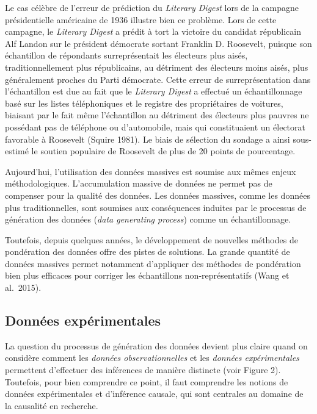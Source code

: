 \documentclass[
  letterpaper,
]{scrbook}
\begin{document}
Le cas célèbre de l'erreur de prédiction du \emph{Literary Digest} lors
de la campagne présidentielle américaine de 1936 illustre bien ce
problème. Lors de cette campagne, le \emph{Literary Digest} a prédit à
tort la victoire du candidat républicain Alf Landon sur le président
démocrate sortant Franklin D. Roosevelt, puisque son échantillon de
répondants surreprésentait les électeurs plus aisés, traditionnellement
plus républicains, au détriment des électeurs moins aisés, plus
généralement proches du Parti démocrate. Cette erreur de
surreprésentation dans l'échantillon est due au fait que le
\emph{Literary Digest} a effectué un échantillonnage basé sur les listes
téléphoniques et le registre des propriétaires de voitures, biaisant par
le fait même l'échantillon au détriment des électeurs plus pauvres ne
possédant pas de téléphone ou d'automobile, mais qui constituaient un
électorat favorable à Roosevelt (Squire 1981). Le biais de sélection du
sondage a ainsi sous-estimé le soutien populaire de Roosevelt de plus de
20 points de pourcentage.

Aujourd'hui, l'utilisation des données massives est soumise aux mêmes
enjeux méthodologiques. L'accumulation massive de données ne permet pas
de compenser pour la qualité des données. Les données massives, comme
les données plus traditionnelles, sont soumises aux conséquences
induites par le processus de génération des données (\emph{data
generating process}) comme un échantillonnage.

Toutefois, depuis quelques années, le développement de nouvelles
méthodes de pondération des données offre des pistes de solutions. La
grande quantité de données massives permet notamment d'appliquer des
méthodes de pondération bien plus efficaces pour corriger les
échantillons non-représentatifs (Wang et al.~2015).

\hypertarget{donnuxe9es-expuxe9rimentales}{%
\subsection{Données expérimentales}\label{donnuxe9es-expuxe9rimentales}}

La question du processus de génération des données devient plus claire
quand on considère comment les \emph{données observationnelles} et les
\emph{données expérimentales} permettent d'effectuer des inférences de
manière distincte (voir Figure 2). Toutefois, pour bien comprendre ce
point, il faut comprendre les notions de données expérimentales et
d'inférence causale, qui sont centrales au domaine de la causalité en
recherche.
\end{document}
